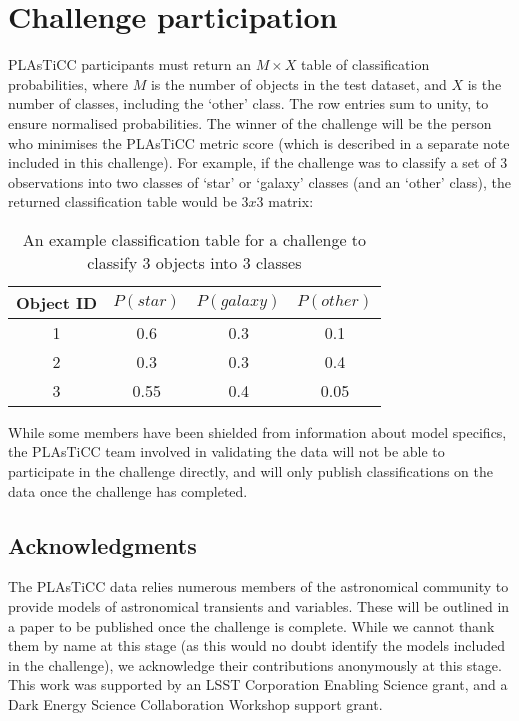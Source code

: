 \documentclass[\docopts]{\docclass}
\begin{document}
\section{Challenge participation}
\label{sec:conclusion}
PLAsTiCC participants must return an $M\times X$ table of classification probabilities, where $M$ is the number of objects in the test dataset, and $X$ is the number of classes, including the `other' class. The row entries sum to unity, to ensure normalised probabilities. The winner of the challenge will be the person who minimises the PLAsTiCC metric score (which is described in a separate note included in this challenge). 
For example, if the challenge was to classify a set of 3 observations into two classes of `star' or `galaxy' classes (and an `other' class), the returned classification table would be $3x3$ matrix:

\begin{table}[htbp!]
\begin{center}
\begin{tabular}{|c|c|c|c|}
Object ID & $P(star)$ & $P(galaxy)$ & $P(other)$ \\
\hline
1 & 0.6 & 0.3 & 0.1\\
2 & 0.3 & 0.3 & 0.4\\
3 & 0.55 & 0.4 & 0.05\\
\end{tabular}
\caption{An example classification table for a challenge to classify 3 objects into 3 classes}
\end{center}
\end{table}

While some members have been shielded from information about model specifics, the PLAsTiCC team involved in validating the data will not be able to participate in the challenge directly, and will only publish classifications on the data once the challenge has completed.


\subsection{Acknowledgments}
The PLAsTiCC data relies numerous members of the astronomical community to provide models of astronomical transients and variables. These will be outlined in a paper to be published once the challenge is complete. While we cannot thank them by name at this stage (as this would no doubt identify the models included in the challenge), we acknowledge their contributions anonymously at this stage. This work was supported by an LSST Corporation Enabling Science grant, and a Dark Energy Science Collaboration Workshop support grant.
\end{document}
